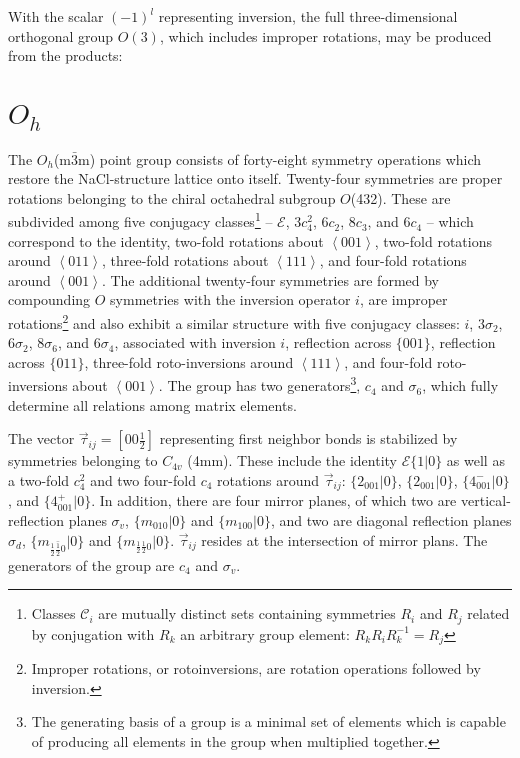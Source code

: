 \documentclass[twocolumn,showpacs,preprintnumbers,superscriptaddress,prb,floatfix,aps,10pt]{revtex4-1}
\newcommand*{\class}{\mathcal{C}}
\newcommand*{\id}{\mathcal{E}}
\newcommand*{\bondvec}{\vec{\tau}_{ij}}
\newcommand{\seitz}[2]{\{#1|#2\}}
\begin{document}
With the scalar $(-1)^l$ representing inversion, the full three-dimensional orthogonal group $O(3)$, which includes improper rotations, may be produced from the products:





\section{$O_h$}
The $O_h$(m$\bar{3}$m) point group consists of forty-eight symmetry operations which restore the NaCl-structure lattice onto itself. Twenty-four symmetries are proper rotations belonging to the chiral octahedral subgroup $O$(432). These are subdivided among five conjugacy classes\footnote{Classes $\class_i$ are mutually distinct sets containing symmetries $R_i$ and $R_j$ related by conjugation with $R_k$ an arbitrary group element: $R_kR_iR_k^{-1}=R_j$} --  $\id$, $3c_4^2$, $6c_2$, $8c_3$, and $6c_4$ -- which correspond to the identity, two-fold rotations about $\left<001\right>$, two-fold rotations around $\left<011\right>$, three-fold rotations about $\left<111\right>$, and four-fold rotations around $\left<001\right>$. The additional twenty-four symmetries are formed by compounding $O$ symmetries with the inversion operator $i$, are improper rotations\footnote{Improper rotations, or rotoinversions, are rotation operations followed by inversion.} and also exhibit a similar structure with five conjugacy classes: $i$, $3\sigma_2$, $6\sigma_2$, $8\sigma_6$, and $6\sigma_4$, associated with inversion $i$, reflection across $\{001\}$, reflection across $\{011\}$, three-fold roto-inversions around $\left<111\right>$, and four-fold roto-inversions about $\left<001\right>$. The group has two generators\footnote{The generating basis of a group is a minimal set of elements which is capable of producing all elements in the group when multiplied together.}, $c_4$ and $\sigma_6$, which fully determine all relations among matrix elements.

The vector $\bondvec = [00\frac{1}{2}]$ representing first neighbor bonds is stabilized by symmetries belonging to $C_{4v}$ (4mm). These include the identity $\id \seitz{1}{0}$ as well as a two-fold $c_{4}^2$ and two four-fold $c_{4}$ rotations around $\bondvec$: $\seitz{2_{001}}{0}$, $\seitz{2_{001}}{0}$, $\seitz{4^-_{001}}{0}$, and $\seitz{4^+_{001}}{0}$. In addition, there are four mirror planes, of which two are vertical-reflection planes $\sigma_v$, $\seitz{m_{010}}{0}$ and $\seitz{m_{100}}{0}$, 
and two are diagonal reflection planes $\sigma_d$, $\seitz{m_{\frac{1}{2}\bar{\frac{1}{2}}0}}{0}$ and $\seitz{m_{\frac{1}{2}\frac{1}{2}0}}{0}$. $\bondvec$ resides at the intersection of mirror plans. The generators of the group are $c_4$ and $\sigma_v$.
\end{document}
